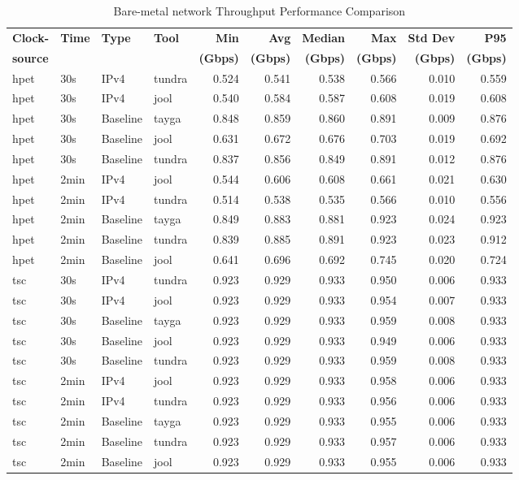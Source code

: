 \begin{table}[htbp]
\centering
\caption{Bare-metal network Throughput Performance Comparison}
\label{tab:throughput_comparison_localdouble}
\footnotesize
\begin{tabular}{|l|l|l|l|r|r|r|r|r|r|}
\hline
\textbf{Clock-} & \textbf{Time} & \textbf{Type} & \textbf{Tool} & \textbf{Min} & \textbf{Avg} & \textbf{Median} & \textbf{Max} & \textbf{Std Dev} & \textbf{P95} \\
\textbf{source} & & & & \textbf{(Gbps)} & \textbf{(Gbps)} & \textbf{(Gbps)} & \textbf{(Gbps)} & \textbf{(Gbps)} & \textbf{(Gbps)} \\
\hline
hpet & 30s & IPv4 & tundra & 0.524 & 0.541 & 0.538 & 0.566 & 0.010 & 0.559 \\
hpet & 30s & IPv4 & jool & 0.540 & 0.584 & 0.587 & 0.608 & 0.019 & 0.608 \\
hpet & 30s & Baseline & tayga & 0.848 & 0.859 & 0.860 & 0.891 & 0.009 & 0.876 \\
hpet & 30s & Baseline & jool & 0.631 & 0.672 & 0.676 & 0.703 & 0.019 & 0.692 \\
hpet & 30s & Baseline & tundra & 0.837 & 0.856 & 0.849 & 0.891 & 0.012 & 0.876 \\
hpet & 2min & IPv4 & jool & 0.544 & 0.606 & 0.608 & 0.661 & 0.021 & 0.630 \\
hpet & 2min & IPv4 & tundra & 0.514 & 0.538 & 0.535 & 0.566 & 0.010 & 0.556 \\
hpet & 2min & Baseline & tayga & 0.849 & 0.883 & 0.881 & 0.923 & 0.024 & 0.923 \\
hpet & 2min & Baseline & tundra & 0.839 & 0.885 & 0.891 & 0.923 & 0.023 & 0.912 \\
hpet & 2min & Baseline & jool & 0.641 & 0.696 & 0.692 & 0.745 & 0.020 & 0.724 \\
\hline
tsc & 30s & IPv4 & tundra & 0.923 & 0.929 & 0.933 & 0.950 & 0.006 & 0.933 \\
tsc & 30s & IPv4 & jool & 0.923 & 0.929 & 0.933 & 0.954 & 0.007 & 0.933 \\
tsc & 30s & Baseline & tayga & 0.923 & 0.929 & 0.933 & 0.959 & 0.008 & 0.933 \\
tsc & 30s & Baseline & jool & 0.923 & 0.929 & 0.933 & 0.949 & 0.006 & 0.933 \\
tsc & 30s & Baseline & tundra & 0.923 & 0.929 & 0.933 & 0.959 & 0.008 & 0.933 \\
tsc & 2min & IPv4 & jool & 0.923 & 0.929 & 0.933 & 0.958 & 0.006 & 0.933 \\
tsc & 2min & IPv4 & tundra & 0.923 & 0.929 & 0.933 & 0.956 & 0.006 & 0.933 \\
tsc & 2min & Baseline & tayga & 0.923 & 0.929 & 0.933 & 0.955 & 0.006 & 0.933 \\
tsc & 2min & Baseline & tundra & 0.923 & 0.929 & 0.933 & 0.957 & 0.006 & 0.933 \\
tsc & 2min & Baseline & jool & 0.923 & 0.929 & 0.933 & 0.955 & 0.006 & 0.933 \\
\hline
\end{tabular}
\end{table}


